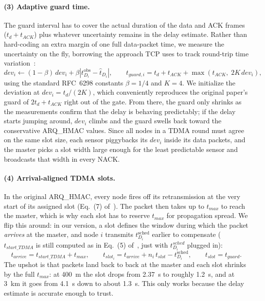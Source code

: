 \documentclass{article}
\begin{document}
\paragraph{(3) Adaptive guard time.} The guard interval has to cover the actual duration of the data and ACK frames ($t_d + t_{ACK}$) plus whatever uncertainty remains in the delay estimate. Rather than hard-coding an extra margin of one full data-packet time, we measure the uncertainty on the fly, borrowing the approach TCP uses to track round-trip time variation~\cite{jacobson1988,rfc6298}:
\begin{equation}
dev_i \leftarrow (1-\beta)\, dev_i + \beta \left| t_{D_i}^{\text{obs}} - \hat{t}_{D_i} \right|,
\qquad
t_{guard,i} = t_d + t_{ACK} + \max\left(t_{ACK},\; 2K\, dev_i\right),
\label{eq:guard}
\end{equation}
using the standard RFC~6298 constants $\beta = 1/4$ and $K = 4$. We initialize the deviation at $dev_i = t_d/(2K)$, which conveniently reproduces the original paper's guard of $2t_d + t_{ACK}$ right out of the gate. From there, the guard only shrinks as the measurements confirm that the delay is behaving predictably; if the delay starts jumping around, $dev_i$ climbs and the guard swells back toward the conservative ARQ\_HMAC values. Since all nodes in a TDMA round must agree on the same slot size, each sensor piggybacks its $dev_i$ inside its data packets, and the master picks a slot width large enough for the least predictable sensor and broadcasts that width in every NACK.

\paragraph{(4) Arrival-aligned TDMA slots.} In the original ARQ\_HMAC, every node fires off its retransmission at the very start of its assigned slot (Eq.~(7) of~\cite{dao2025}). The packet then takes up to $t_{max}$ to reach the master, which is why each slot has to reserve $t_{max}$ for propagation spread. We flip this around: in our version, a slot defines the window during which the packet \emph{arrives} at the master, and node $i$ transmits $t_{D_i}^{\text{sched}}$ earlier to compensate ($t_{start\_TDMA}$ is still computed as in Eq.~(5) of~\cite{dao2025}, just with $t^{sched}_{D_i}$ plugged in):
\begin{equation}
t_{arrive} = t_{start\_TDMA} + t_{max}, \qquad
t_{slot_i} = t_{arrive} + n_i\, t_{slot} - t_{D_i}^{\text{sched}}, \qquad
t_{slot} = t_{guard}.
\label{eq:aligned}
\end{equation}
The upshot is that packets land back to back at the master and each slot shrinks by the full $t_{max}$: at 400~m the slot drops from 2.37~s to roughly 1.2~s, and at 3~km it goes from 4.1~s down to about 1.3~s. This only works because the delay estimate is accurate enough to trust.
\end{document}
